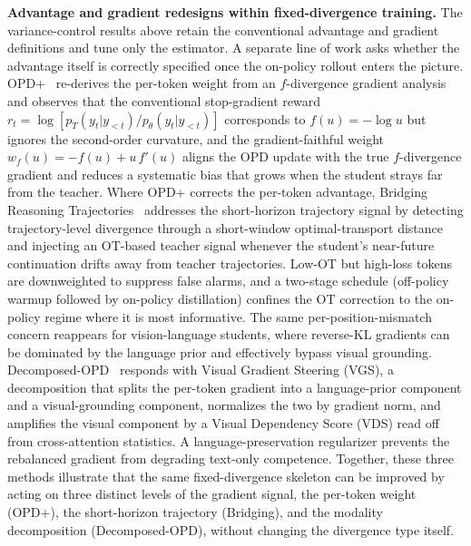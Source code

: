 \documentclass{article} %
\newcommand{\ptheta}{p_\theta}
\newcommand{\pteacher}{p_T}
\begin{document}
\textbf{Advantage and gradient redesigns within fixed-divergence training.} The variance-control results above retain the conventional advantage and gradient definitions and tune only the estimator. A separate line of work asks whether the advantage itself is correctly specified once the on-policy rollout enters the picture. OPD+~\citep{2606.01039} re-derives the per-token weight from an $f$-divergence gradient analysis and observes that the conventional stop-gradient reward $r_t = \log[\pteacher(y_t|y_{<t})/\ptheta(y_t|y_{<t})]$ corresponds to $f(u) = -\log u$ but ignores the second-order curvature, and the gradient-faithful weight $w_f(u) = -f(u) + u\,f'(u)$ aligns the OPD update with the true $f$-divergence gradient and reduces a systematic bias that grows when the student strays far from the teacher. Where OPD+ corrects the per-token advantage, Bridging Reasoning Trajectories~\citep{2606.00305} addresses the short-horizon trajectory signal by detecting trajectory-level divergence through a short-window optimal-transport distance and injecting an OT-based teacher signal whenever the student's near-future continuation drifts away from teacher trajectories. Low-OT but high-loss tokens are downweighted to suppress false alarms, and a two-stage schedule (off-policy warmup followed by on-policy distillation) confines the OT correction to the on-policy regime where it is most informative. The same per-position-mismatch concern reappears for vision-language students, where reverse-KL gradients can be dominated by the language prior and effectively bypass visual grounding. Decomposed-OPD~\citep{2606.00564} responds with Visual Gradient Steering (VGS), a decomposition that splits the per-token gradient into a language-prior component and a visual-grounding component, normalizes the two by gradient norm, and amplifies the visual component by a Visual Dependency Score (VDS) read off from cross-attention statistics. A language-preservation regularizer prevents the rebalanced gradient from degrading text-only competence. Together, these three methods illustrate that the same fixed-divergence skeleton can be improved by acting on three distinct levels of the gradient signal, the per-token weight (OPD+), the short-horizon trajectory (Bridging), and the modality decomposition (Decomposed-OPD), without changing the divergence type itself.
\end{document}
